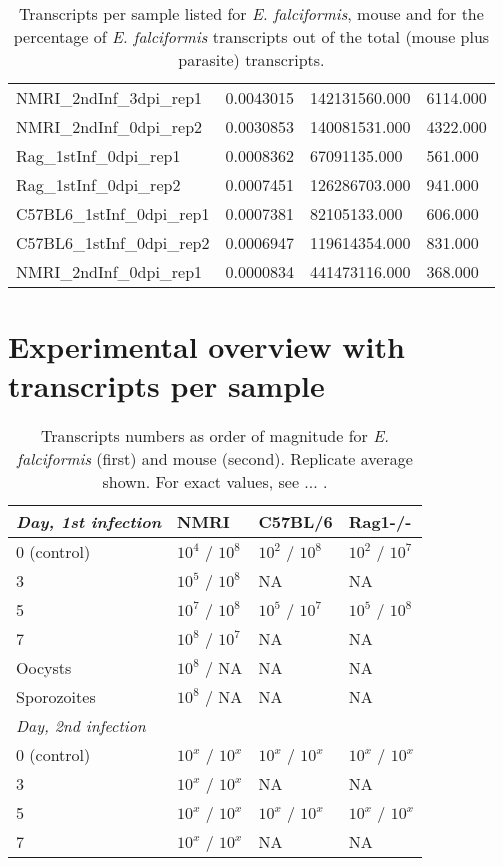\documentclass{article}
\begin{document}
\begin{table}[ht]
\begin{tabular}{llll}
  NMRI\_2ndInf\_3dpi\_rep1 &   0.0043015 & 142131560.000 & 6114.000 \\
  NMRI\_2ndInf\_0dpi\_rep2 &   0.0030853 & 140081531.000 & 4322.000 \\
  Rag\_1stInf\_0dpi\_rep1 &   0.0008362 & 67091135.000 & 561.000 \\
  Rag\_1stInf\_0dpi\_rep2 &   0.0007451 & 126286703.000 & 941.000 \\
  C57BL6\_1stInf\_0dpi\_rep1 &   0.0007381 & 82105133.000 & 606.000 \\
  C57BL6\_1stInf\_0dpi\_rep2 &   0.0006947 & 119614354.000 & 831.000 \\
  NMRI\_2ndInf\_0dpi\_rep1 &   0.0000834 & 441473116.000 & 368.000 \\
  
 
  \hline
\end{tabular}
\caption{Transcripts per sample listed for \textit{E. falciformis}, mouse and for the percentage of \textit{E. falciformis} transcripts out of the total (mouse plus parasite) transcripts. }
\end{table}

\section{Experimental overview with transcripts per sample}
	\setlength{\tabcolsep}{14pt}
\begin{table}
	\begin{center}
\begin{tabular}{*4l}    \toprule
\emph{Day, 1st infection}  	& NMRI  & C57BL/6  & Rag1-/- \\ \midrule
0 (control)     & $10^4$ / $10^8$  & $10^2$ / $10^8$  & $10^2$ / $10^7$  \\ %
3  		& $10^5$ / $10^8$ & NA  & NA \\ 
5  		& $10^7$ / $10^8$ & $10^5$ / $10^7$  & $10^5$ / $10^8$ \\
7  		& $10^8$ / $10^7$ & NA  & NA \\ 
Oocysts 	& $10^8$ / NA & NA  & NA \\ 
Sporozoites 	& $10^8$ / NA & NA  & NA \\ \midrule

\emph{Day, 2nd infection}  	\\ \midrule
0 (control)     & $10^x$ / $10^x$  & $10^x$ / $10^x$  & $10^x$ / $10^x$  \\ %
3  		& $10^x$ / $10^x$ & NA  & NA \\ 
5  		& $10^x$ / $10^x$ & $10^x$ / $10^x$  & $10^x$ / $10^x$ \\
7  		& $10^x$ / $10^x$ & NA  & NA \\ 
	
	
	\bottomrule
 \hline
\end{tabular}
	\caption{Transcripts numbers as order of magnitude for \emph{E. falciformis} (first) and mouse (second). Replicate average shown. For exact values, see ... . }
\end{center}
\end{table}
\end{document}
